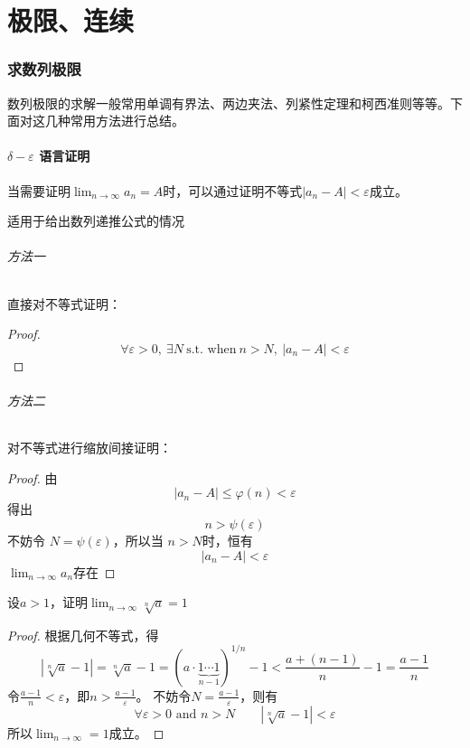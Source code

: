 \part{极限、连续}

\section{求数列极限}
数列极限的求解一般常用单调有界法、两边夹法、列紧性定理和柯西准则等等。下面对这几种常用方法进行总结。
\subsection{\texorpdfstring{$ \delta - \varepsilon  $}{δ-ε} 语言证明}
当需要证明$\lim_{n \to \infty} a_n = A$时，可以通过证明不等式$ \left\lvert a_n - A\right\rvert < \varepsilon $成立。
\begin{situation}
    适用于给出数列递推公式的情况
\end{situation}
\paragraph{方法一} 直接对不等式证明：
\begin{proof}
    \[
        \forall \varepsilon > 0, ~ \exists N ~ \text{s.t. when}~ n > N,~
        \left\lvert a_n - A\right\rvert < \varepsilon
    \]
\end{proof}


\paragraph{方法二} 对不等式进行缩放间接证明：
\begin{proof}
    由\[ \left\lvert a_n - A \right\rvert \leq \varphi(n) < \varepsilon \]
    得出 \[ n > \psi(\varepsilon) \]
    不妨令 $N = \psi(\varepsilon)$，所以当 $n > N$时，恒有
    \[ \left\lvert a_n - A\right\rvert < \varepsilon \]
    $\lim_{n \to \infty} a_n$存在
\end{proof}

\begin{example}
    设$ a > 1 $，证明$ \lim_{n \to \infty} \sqrt[n]{a} = 1 $
\end{example}
\begin{proof}
    根据几何不等式，得
    \[
        \left\lvert \sqrt[n]{a} - 1 \right\rvert
        = \sqrt[n]{a} - 1
        = (a \cdot \underbrace{1\cdots1}_{n-1})^{1/n} - 1
        < \frac{a+(n-1)}{n} - 1
        = \frac{a-1}{n}
    \]
    令$ \frac{a-1}{n}<\varepsilon $，即$ n > \frac{a-1}{\varepsilon} $。
    不妨令$N = \frac{a-1}{\varepsilon}$，则有
    \[
        \forall\varepsilon>0 \text{ and } n > N \qquad \left\lvert \sqrt[n]{a}-1 \right\rvert<\varepsilon
    \]
    所以$\lim_{n \to \infty} = 1$成立。
\end{proof}

